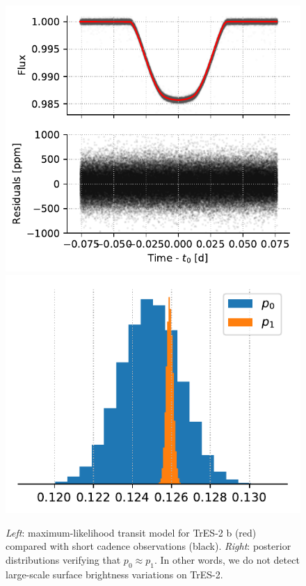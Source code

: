 \begin{figure}%
    \centering
    \includegraphics[scale=0.75]{robin/tres2_residuals.pdf}
    \includegraphics[scale=0.75]{robin/tres2_agreement.pdf}
    \caption{\textsl{Left}: maximum-likelihood transit model for TrES-2 b (red) compared with \kepler short cadence observations (black). \textsl{Right}: posterior distributions verifying that $p_0 \approx p_1$. In other words, we do not detect large-scale surface brightness variations on TrES-2.}
    \label{fig:tres2}
\end{figure}

